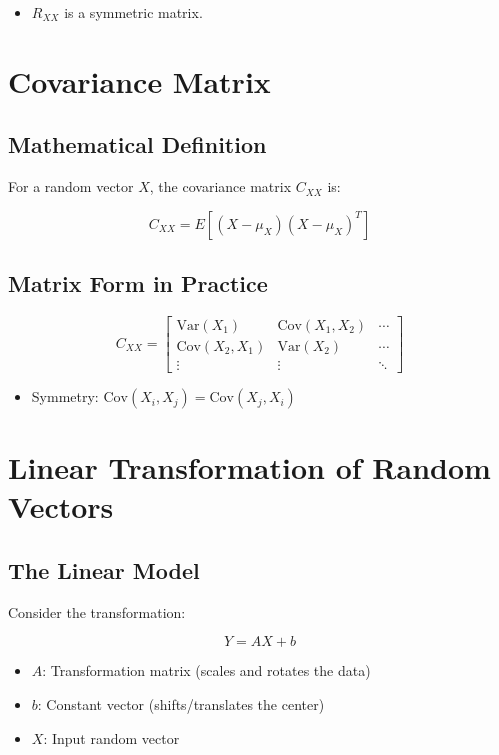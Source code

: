 \documentclass[12pt]{article}
\begin{document}
\begin{itemize}
    \item $R_{XX}$ is a symmetric matrix.
\end{itemize}

\section{Covariance Matrix}

\subsection{Mathematical Definition}

For a random vector $X$, the covariance matrix $C_{XX}$ is:

\[
C_{XX} = E[(X - \mu_X)(X - \mu_X)^T]
\]

\subsection{Matrix Form in Practice}

\[
C_{XX} =
\begin{bmatrix}
\mathrm{Var}(X_1) & \mathrm{Cov}(X_1, X_2) & \cdots \\
\mathrm{Cov}(X_2, X_1) & \mathrm{Var}(X_2) & \cdots \\
\vdots & \vdots & \ddots
\end{bmatrix}
\]

\begin{itemize}
    \item Symmetry: $\mathrm{Cov}(X_i, X_j) = \mathrm{Cov}(X_j, X_i)$
\end{itemize}

\section{Linear Transformation of Random Vectors}

\subsection{The Linear Model}

Consider the transformation:

\[
Y = AX + b
\]

\begin{itemize}
    \item $A$: Transformation matrix (scales and rotates the data)
    \item $b$: Constant vector (shifts/translates the center)
    \item $X$: Input random vector
\end{itemize}
\end{document}
